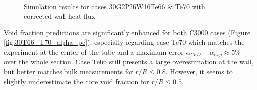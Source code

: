 \begin{figure}[!h]
\centering
{}
\\
\caption{Simulation results for cases 30G2P26W16Te66 \& Te70 with corrected wall heat flux}
\label{fig:deb_cfd_30T66_T70_pc}
\end{figure}

\npar


Void fraction predictions are significantly enhanced for both C3000 cases (Figure \ref{fig:30T66_T70_alpha_pc}), especially regarding case Te70 which matches the experiment at the center of the tube and a maximum error $\alpha_{CFD} - \alpha_{exp} \approx 5\%$ over the whole section. Case Te66 still presents a large overestimation at the wall, but better matches bulk measurements for $r/R \leq 0.8$. However, it seems to slightly underestimate the core void fraction for $r/R \leq 0.5$.


